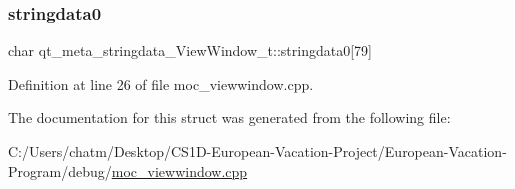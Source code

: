 \mbox{\label{structqt__meta__stringdata___view_window__t_abee99e0cd32dca0605113dfd576c567d}} 
\subsubsection{\texorpdfstring{stringdata0}{stringdata0}}
{\footnotesize\ttfamily char qt\+\_\+meta\+\_\+stringdata\+\_\+\+View\+Window\+\_\+t\+::stringdata0\mbox{[}79\mbox{]}}



Definition at line 26 of file moc\+\_\+viewwindow.\+cpp.



The documentation for this struct was generated from the following file\+:\begin{DoxyCompactItemize}
\item 
C\+:/\+Users/chatm/\+Desktop/\+C\+S1\+D-\/\+European-\/\+Vacation-\/\+Project/\+European-\/\+Vacation-\/\+Program/debug/\mbox{\hyperlink{moc__viewwindow_8cpp}{moc\+\_\+viewwindow.\+cpp}}\end{DoxyCompactItemize}
